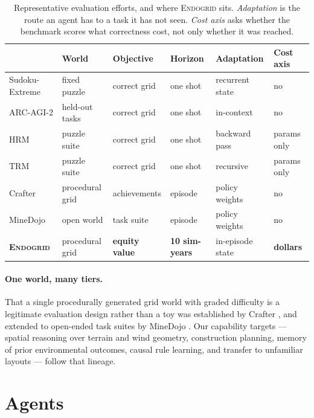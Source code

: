 \documentclass{article}
\begin{document}
\begin{table}[t]
\centering\small
\setlength{\tabcolsep}{4pt}
\caption{Representative evaluation efforts, and where \textsc{Endogrid} sits.
\emph{Adaptation} is the route an agent has to a task it has not seen.
\emph{Cost axis} asks whether the benchmark scores what correctness cost, not
only whether it was reached.}
\label{tab:related}
\begin{tabular}{llllll}
\toprule
& World & Objective & Horizon & Adaptation & Cost axis \\
\midrule
Sudoku-Extreme \citep{kosowski2025bdh} & fixed puzzle & correct grid & one shot & recurrent state & no \\
ARC-AGI-2 \citep{chollet2025arcagi2} & held-out tasks & correct grid & one shot & in-context & no \\
HRM \citep{wang2025hrm} & puzzle suite & correct grid & one shot & backward pass & params only \\
TRM \citep{jolicoeurmartineau2025trm} & puzzle suite & correct grid & one shot & recursive & params only \\
Crafter \citep{hafner2022crafter} & procedural grid & achievements & episode & policy weights & no \\
MineDojo \citep{fan2022minedojo} & open world & task suite & episode & policy weights & no \\
\midrule
\textbf{\textsc{Endogrid}} & procedural grid & \textbf{equity value} & \textbf{10 sim-years} & in-episode state & \textbf{dollars} \\
\bottomrule
\end{tabular}
\end{table}

\paragraph{One world, many tiers.} That a single procedurally generated grid
world with graded difficulty is a legitimate evaluation design rather than a toy
was established by Crafter \citep{hafner2022crafter}, and extended to
open-ended task suites by MineDojo \citep{fan2022minedojo}. Our capability
targets --- spatial reasoning over terrain and wind geometry, construction
planning, memory of prior environmental outcomes, causal rule learning, and
transfer to unfamiliar layouts --- follow that lineage.

\section{Agents}
\end{document}
